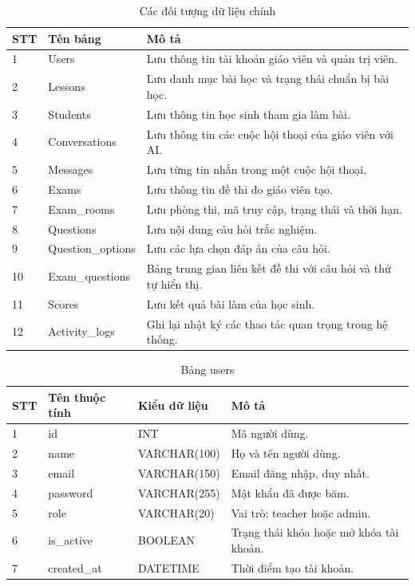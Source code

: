\documentclass[12pt,a4paper]{article}
\begin{document}
	\begin{table}[H]
		\centering
		\caption{Các đối tượng dữ liệu chính}
		\label{tab:doi-tuong}
		\begin{tabular}{|p{1.5cm}|p{4cm}|p{8.5cm}|}
			\hline
			\centering\textbf{STT} & \centering\textbf{Tên bảng} & \centering\arraybackslash\textbf{Mô tả} \\
			\hline
			1 & Users & Lưu thông tin tài khoản giáo viên và quản trị viên. \\
			\hline
			2 & Lessons & Lưu danh mục bài học và trạng thái chuẩn bị bài học. \\
			\hline
			3 & Students & Lưu thông tin học sinh tham gia làm bài. \\
			\hline
			4 & Conversations & Lưu thông tin các cuộc hội thoại của giáo viên với AI. \\
			\hline
			5 & Messages & Lưu từng tin nhắn trong một cuộc hội thoại. \\
			\hline
			6 & Exams & Lưu thông tin đề thi do giáo viên tạo. \\
			\hline
			7 & Exam\_rooms & Lưu phòng thi, mã truy cập, trạng thái và thời hạn. \\
			\hline
			8 & Questions & Lưu nội dung câu hỏi trắc nghiệm. \\
			\hline
			9 & Question\_options & Lưu các lựa chọn đáp án của câu hỏi. \\
			\hline
			10 & Exam\_questions & Bảng trung gian liên kết đề thi với câu hỏi và thứ tự hiển thị. \\
			\hline
			11 & Scores & Lưu kết quả bài làm của học sinh. \\
			\hline
			12 & Activity\_logs & Ghi lại nhật ký các thao tác quan trọng trong hệ thống. \\
			\hline
		\end{tabular}
	\end{table}
	
	
	\begin{table}[H]
		\centering
		\caption{Bảng users}
		\label{tab:users}
		\begin{tabular}{|p{1.5cm}|p{4cm}|p{4cm}|p{5.5cm}|}
			\hline
			\centering\textbf{STT} & \centering\textbf{Tên thuộc tính} & \centering\textbf{Kiểu dữ liệu} & \centering\arraybackslash\textbf{Mô tả} \\
			\hline
			1 & id & INT & Mã người dùng. \\
			\hline
			2 & name & VARCHAR(100) & Họ và tên người dùng. \\
			\hline
			3 & email & VARCHAR(150) & Email đăng nhập, duy nhất. \\
			\hline
			4 & password & VARCHAR(255) & Mật khẩu đã được băm. \\
			\hline
			5 & role & VARCHAR(20) & Vai trò: teacher hoặc admin. \\
			\hline
			6 & is\_active & BOOLEAN & Trạng thái khóa hoặc mở khóa tài khoản. \\
			\hline
			7 & created\_at & DATETIME & Thời điểm tạo tài khoản. \\
			\hline
		\end{tabular}
	\end{table}
	
\end{document}
